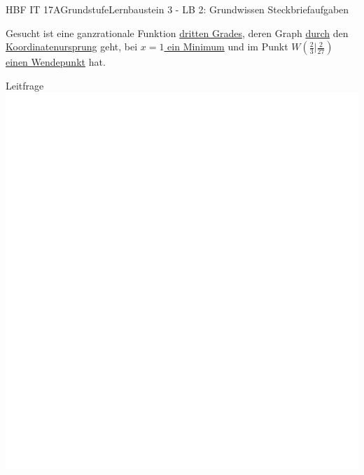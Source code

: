 \documentclass[oneside,openany,headings=optiontotoc,11pt,numbers=noenddot]{scrreprt}
\begin{document}
	\begin{worksheet}{HBF IT 17A}{Grundstufe}{Lernbaustein 3 - LB 2: Grundwissen Steckbriefaufgaben}
		\begin{framed}
			\noindent
			Gesucht ist eine ganzrationale Funktion \underline{dritten Grades}, deren Graph \underline{durch} den \underline{Koordinatenursprung} geht, bei \underline{\(x=1\) ein Minimum} und im Punkt \underline{\(W(\frac{2}{3}|\frac{2}{27})\) einen Wendepunkt} hat.
		\end{framed}
		\begin{framed}
			\noindent
			\tiny{\color{codegray}Leitfrage}\\
			\includegraphics[scale=0.15]{../empty.jpg}
		\end{framed}
		\begin{framed}

\end{framed}
\end{worksheet}
\end{document}
